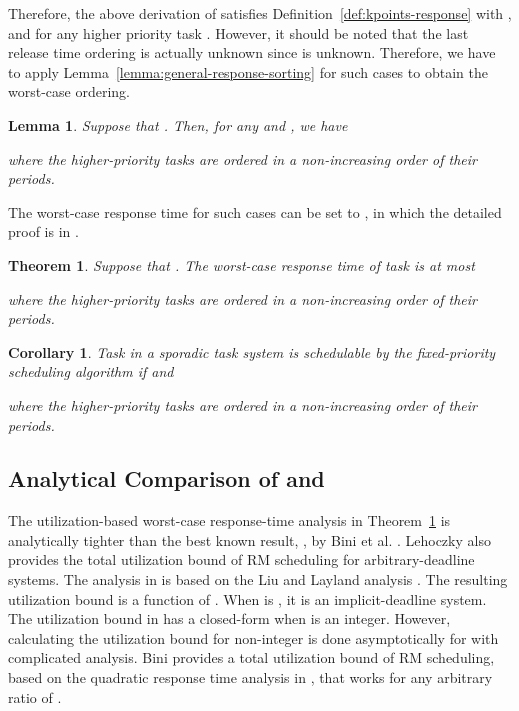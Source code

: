\documentclass[10pt,conference]{IEEEtran}
\newcommand{\frameworkkq}[1]{}
\newcommand{\frameworkku}[1]{}
\newtheorem{theorem}{Theorem}
\newtheorem{lemma}{Lemma}
\newtheorem{corollary}{Corollary}
\begin{document}
Therefore, the above derivation of  satisfies
Definition~\ref{def:kpoints-response} with , and
 for any higher priority task . However, it should
be noted that the last release time ordering  is actually unknown
since  is unknown. Therefore, we have to apply
Lemma~\ref{lemma:general-response-sorting} for such cases to obtain
the worst-case ordering.

\begin{lemma}
  \label{lemma:finishing-time-sporadic-h}
  Suppose that . Then, for any
   and , we have
  
  where the  higher-priority tasks are ordered
  in a non-increasing order of their periods.
\end{lemma}

The worst-case response time for such cases can be set to , in
which the detailed proof is in \cite{DBLP:journals/corr/abs-kRTA,DBLP:conf/rtss/ChenHL16}.
\begin{theorem}
  \label{theorem:response-time-sporadic}
  Suppose that . The worst-case
  response time of task  is at most
  
  where the  higher-priority tasks are ordered
  in a non-increasing order of their periods.
\end{theorem}

\begin{corollary}
  \label{corollary:arbitrary-response-schedulability}
  Task  in a sporadic task system is schedulable by the
  fixed-priority scheduling algorithm if 
  and 
  
  where the  higher-priority tasks are ordered
  in a non-increasing order of their periods.
\end{corollary}

\subsection{Analytical Comparison of \frameworkkq{} and \frameworkku{}}

The utilization-based worst-case response-time analysis in  
Theorem~\ref{theorem:response-time-sporadic} is analytically tighter  
than the best known result, , by Bini et  
al. \cite{bini2009response}. 
 Lehoczky \cite{DBLP:conf/rtss/Lehoczky90} also provides the total
utilization bound of RM scheduling for arbitrary-deadline systems. The
analysis in \cite{DBLP:conf/rtss/Lehoczky90} is based on the Liu and
Layland analysis \cite{liu1973scheduling}. The resulting utilization
bound is a function of . When
 is , it is an implicit-deadline system. The utilization
bound in \cite{DBLP:conf/rtss/Lehoczky90} has a closed-form when
 is an integer. However, calculating the utilization bound for
non-integer  is done asymptotically for  with
complicated analysis.  Bini \cite{DBLP:journals/tc/Bini15} provides a total utilization bound
of RM scheduling, based on the quadratic response time analysis in
\cite{bini2009response}, that works for any arbitrary ratio of
. 
\end{document}
